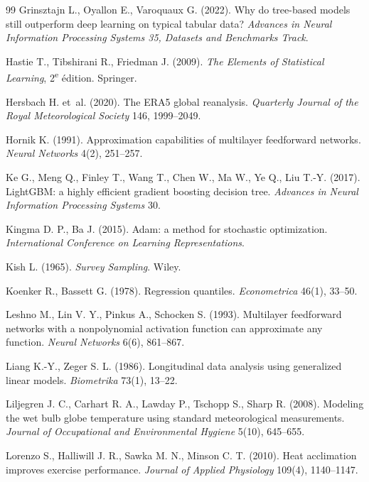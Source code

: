 \documentclass[11pt,a4paper]{article}
\begin{document}
\begin{thebibliography}{99}
Grinsztajn L., Oyallon E., Varoquaux G. (2022). Why do tree-based models still outperform deep learning on typical
tabular data? \emph{Advances in Neural Information Processing Systems 35, Datasets and Benchmarks Track}.

Hastie T., Tibshirani R., Friedman J. (2009). \emph{The Elements of Statistical Learning}, 2\textsuperscript{e}
édition. Springer.

Hersbach H. et~al. (2020). The ERA5 global reanalysis. \emph{Quarterly Journal of the Royal Meteorological Society}
146, 1999--2049.

Hornik K. (1991). Approximation capabilities of multilayer feedforward networks. \emph{Neural Networks} 4(2),
251--257.

Ke G., Meng Q., Finley T., Wang T., Chen W., Ma W., Ye Q., Liu T.-Y. (2017). LightGBM: a highly efficient gradient
boosting decision tree. \emph{Advances in Neural Information Processing Systems} 30.

Kingma D. P., Ba J. (2015). Adam: a method for stochastic optimization. \emph{International Conference on Learning
Representations}.

Kish L. (1965). \emph{Survey Sampling}. Wiley.

Koenker R., Bassett G. (1978). Regression quantiles. \emph{Econometrica} 46(1), 33--50.

Leshno M., Lin V. Y., Pinkus A., Schocken S. (1993). Multilayer feedforward networks with a nonpolynomial activation
function can approximate any function. \emph{Neural Networks} 6(6), 861--867.

Liang K.-Y., Zeger S. L. (1986). Longitudinal data analysis using generalized linear models. \emph{Biometrika} 73(1),
13--22.

Liljegren J. C., Carhart R. A., Lawday P., Tschopp S., Sharp R. (2008). Modeling the wet bulb globe temperature using
standard meteorological measurements. \emph{Journal of Occupational and Environmental Hygiene} 5(10), 645--655.

Lorenzo S., Halliwill J. R., Sawka M. N., Minson C. T. (2010). Heat acclimation improves exercise performance.
\emph{Journal of Applied Physiology} 109(4), 1140--1147.


\end{thebibliography}
\end{document}
